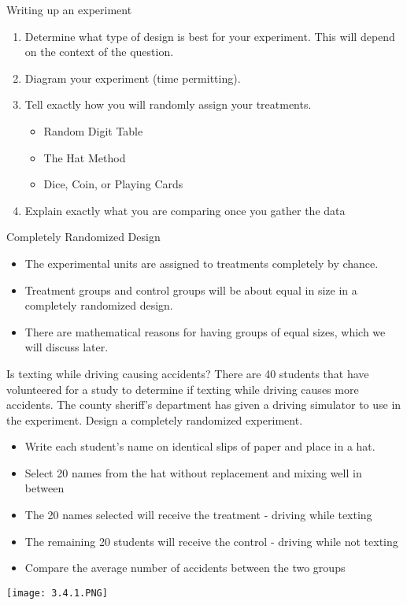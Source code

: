 \documentclass[../stats.tex]{subfiles}
\begin{document}
Writing up an experiment 
\begin{enumerate}
    \item Determine what type of design is best for your experiment. This will depend on the context of the question.
    \item Diagram your experiment (time permitting).
    \item Tell exactly how you will randomly assign your treatments.
    \begin{itemize}
        \item Random Digit Table 
        \item The Hat Method 
        \item Dice, Coin, or Playing Cards 
    \end{itemize}
    \item Explain exactly what you are comparing once you gather the data 
\end{enumerate}

Completely Randomized Design 
\begin{itemize}
    \item The experimental units are assigned to treatments completely by chance.
    \item Treatment groups and control groups will be about equal in size in a completely randomized design.
    \item There are mathematical reasons for having groups of equal sizes, which we will discuss later.
\end{itemize}

\begin{example}
    Is texting while driving causing accidents? There are 40 students that have volunteered for a study to determine if texting while driving causes more accidents. The county sheriff's department has given a driving simulator to use in the experiment. Design a completely randomized experiment.

    \begin{itemize}
        \item Write each student's name on identical slips of paper and place in a hat.
        \item Select 20 names from the hat without replacement and mixing well in between 
        \item The 20 names selected will receive the treatment - driving while texting 
        \item The remaining 20 students will receive the control - driving while not texting 
        \item Compare the average number of accidents between the two groups 
    \end{itemize}
    \begin{center}
        \texttt{[image: 3.4.1.PNG]}
    \end{center}
\end{example}
\end{document}
